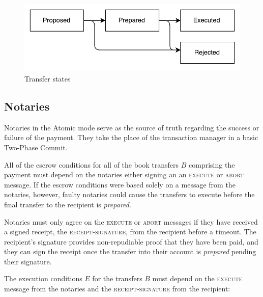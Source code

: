 \documentclass[letterpaper,twocolumn,10pt]{article}
\begin{document}
\begin{figure}[ht]
    \centering
    \includegraphics[width=\columnwidth]{figures/transfer-states.pdf}
    \caption{Transfer states}
    \label{fig:transfer-states}
\end{figure}


\subsection{Notaries}


Notaries in the Atomic mode serve as the source of truth regarding the success or failure of the payment. They take the place of the transaction manager in a basic Two-Phase Commit.

All of the escrow conditions for all of the book transfers $B$ comprising the payment must depend on the notaries either signing an an \textsc{execute} or \textsc{abort} message. If the escrow conditions were based solely on a message from the notaries, however, faulty notaries could cause the transfers to execute before the final transfer to the recipient is \textit{prepared}. \cite{dolev1983authenticated}

Notaries must only agree on the \textsc{execute} or \textsc{abort} messages if they have received a signed receipt, the \textsc{receipt-signature}, from the recipient before a timeout. The recipient's signature provides non-repudiable proof that they have been paid, and they can sign the receipt once the transfer into their account is \textit{prepared} pending their signature. 


The execution conditions $E$ for the transfers $B$ must depend on the \textsc{execute} message from the notaries and the \textsc{receipt-signature} from the recipient:
\end{document}
